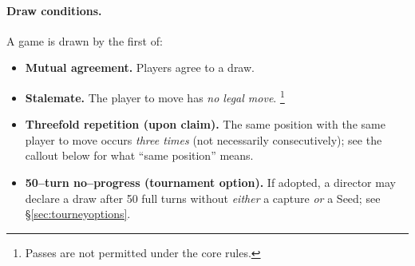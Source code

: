 \documentclass[11pt]{article}
\begin{document}
\paragraph{Draw conditions.}
A game is drawn by the first of:
\begin{itemize}[leftmargin=1.3em,itemsep=0.25em]
  \item \textbf{Mutual agreement.} Players agree to a draw.
  \item \textbf{Stalemate.} The player to move has \emph{no legal move}.%
  \footnote{Passes are not permitted under the core rules.}
  \item \textbf{Threefold repetition (upon claim).} The same position with the same player to move occurs \emph{three times} (not necessarily consecutively); see the callout below for what “same position” means.
  \item \textbf{50–turn no–progress (tournament option).} If adopted, a director may declare a draw after 50 full turns without \emph{either} a capture \emph{or} a Seed; see §\ref{sec:tourneyoptions}.
\end{itemize}
\end{document}
